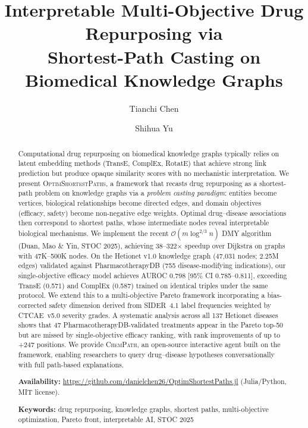 \documentclass[11pt,a4paper]{article}
\title{Interpretable Multi-Objective Drug Repurposing via\\
Shortest-Path Casting on Biomedical Knowledge Graphs}
\author{Tianchi Chen \and Shihua Yu}
\date{}
\newcommand{\BigO}[1]{\mathcal{O}(#1)}
\newcommand{\optim}{\textsc{OptimShortestPaths}}
\newcommand{\chempath}{\textsc{ChemPath}}
\begin{document}
\maketitle

\begin{abstract}
Computational drug repurposing on biomedical knowledge graphs typically
relies on latent embedding methods (TransE, ComplEx, RotatE) that achieve
strong link prediction but produce opaque similarity scores with no
mechanistic interpretation. We present \optim{}, a framework that recasts
drug repurposing as a shortest-path problem on knowledge graphs via a
\emph{problem casting paradigm}: entities become vertices, biological
relationships become directed edges, and domain objectives (efficacy,
safety) become non-negative edge weights. Optimal drug--disease
associations then correspond to shortest paths, whose intermediate nodes
reveal interpretable biological mechanisms. We implement the recent
$\BigO{m \log^{2/3} n}$ DMY algorithm (Duan, Mao \& Yin, STOC 2025),
achieving 38--322$\times$ speedup over Dijkstra on graphs with
47K--500K nodes. On the Hetionet v1.0 knowledge graph (47,031 nodes;
2.25M edges) validated against PharmacotherapyDB (755 disease-modifying
indications), our single-objective efficacy model achieves AUROC 0.798
[95\% CI 0.785--0.811], exceeding TransE (0.571) and ComplEx (0.587)
trained on identical triples under the same protocol.
We extend this to a multi-objective Pareto framework incorporating a
bias-corrected safety dimension derived from SIDER~4.1 label frequencies
weighted by CTCAE~v5.0 severity grades. A systematic analysis across all
137 Hetionet diseases shows that 47 PharmacotherapyDB-validated treatments
appear in the Pareto top-50 but are missed by single-objective efficacy
ranking, with rank improvements of up to +247 positions.
We provide \chempath{}, an open-source interactive agent built on the
framework, enabling researchers to query drug--disease hypotheses
conversationally with full path-based explanations.

\medskip
\noindent\textbf{Availability:}
\url{https://github.com/danielchen26/OptimShortestPaths.jl} (Julia/Python, MIT license).

\medskip
\noindent\textbf{Keywords:} drug repurposing, knowledge graphs, shortest paths,
multi-objective optimization, Pareto front, interpretable AI, STOC 2025
\end{abstract}
\end{document}
